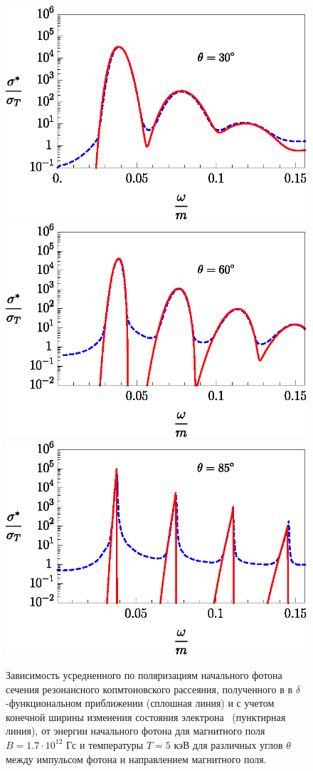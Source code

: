 \documentclass[cp1251%
               ]{jetp} %
\begin{document}
\begin{figure}[t!]\centering
\includegraphics[width=0.99\linewidth,clip]{fig3_1.eps}
\includegraphics[width=0.99\linewidth,clip]{fig3_2.eps}
\includegraphics[width=0.99\linewidth,clip]{fig3_3.eps}
\caption{Зависимость усредненного по поляризациям начального фотона сечения резонансного копмтоновского рассеяния, полученного в в $\delta$-функциональном приближении (сплошная линия) и с учетом конечной ширины изменения состояния электрона~\cite{Harding:1991} (пунктирная линия), от энергии начального фотона для магнитного поля $B = 1.7 \cdot 10^{12}$ Гс и температуры $T=5$ кэВ для различных углов $\theta$ между импульсом фотона и направлением магнитного поля.}
\label{fig3}
\end{figure}
\end{document}
